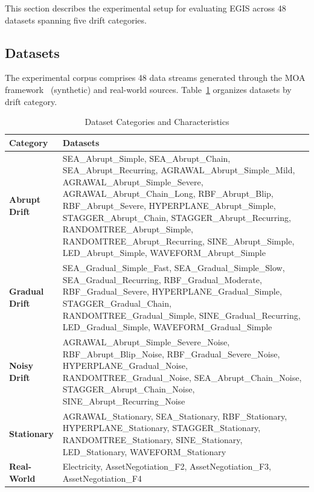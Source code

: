 \documentclass[lettersize,journal]{IEEEtran}
\begin{document}
This section describes the experimental setup for evaluating EGIS across 48 datasets spanning five drift categories.

\subsection{Datasets}

The experimental corpus comprises 48 data streams generated through the MOA framework~\cite{bifet2010moa} (synthetic) and real-world sources. Table~\ref{tab:datasets} organizes datasets by drift category.

\begin{table}[htbp]
\centering
\caption{Dataset Categories and Characteristics}
\label{tab:datasets}
\footnotesize
\begin{tabular}{p{2.2cm}p{5.3cm}}
\toprule
\textbf{Category} & \textbf{Datasets} \\
\midrule
\textbf{Abrupt Drift} &
SEA\_Abrupt\_Simple, SEA\_Abrupt\_Chain, SEA\_Abrupt\_Recurring, AGRAWAL\_Abrupt\_Simple\_Mild, AGRAWAL\_Abrupt\_Simple\_Severe, AGRAWAL\_Abrupt\_Chain\_Long, RBF\_Abrupt\_Blip, RBF\_Abrupt\_Severe, HYPERPLANE\_Abrupt\_Simple, STAGGER\_Abrupt\_Chain, STAGGER\_Abrupt\_Recurring, RANDOMTREE\_Abrupt\_Simple, RANDOMTREE\_Abrupt\_Recurring, SINE\_Abrupt\_Simple, LED\_Abrupt\_Simple, WAVEFORM\_Abrupt\_Simple \\
\midrule
\textbf{Gradual Drift} &
SEA\_Gradual\_Simple\_Fast, SEA\_Gradual\_Simple\_Slow, SEA\_Gradual\_Recurring, RBF\_Gradual\_Moderate, RBF\_Gradual\_Severe, HYPERPLANE\_Gradual\_Simple, STAGGER\_Gradual\_Chain, RANDOMTREE\_Gradual\_Simple, SINE\_Gradual\_Recurring, LED\_Gradual\_Simple, WAVEFORM\_Gradual\_Simple \\
\midrule
\textbf{Noisy Drift} &
AGRAWAL\_Abrupt\_Simple\_Severe\_Noise, RBF\_Abrupt\_Blip\_Noise, RBF\_Gradual\_Severe\_Noise, HYPERPLANE\_Gradual\_Noise, RANDOMTREE\_Gradual\_Noise, SEA\_Abrupt\_Chain\_Noise, STAGGER\_Abrupt\_Chain\_Noise, SINE\_Abrupt\_Recurring\_Noise \\
\midrule
\textbf{Stationary} &
AGRAWAL\_Stationary, SEA\_Stationary, RBF\_Stationary, HYPERPLANE\_Stationary, STAGGER\_Stationary, RANDOMTREE\_Stationary, SINE\_Stationary, LED\_Stationary, WAVEFORM\_Stationary \\
\midrule
\textbf{Real-World} &
Electricity, AssetNegotiation\_F2, AssetNegotiation\_F3, AssetNegotiation\_F4 \\
\bottomrule
\end{tabular}
\end{table}
\end{document}
